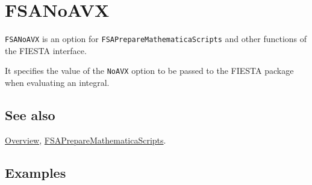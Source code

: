\documentclass[../FeynHelpersManual.tex]{subfiles}
\begin{document}
\begin{Shaded}
\begin{Highlighting}[]
 
\end{Highlighting}
\end{Shaded}

\hypertarget{fsanoavx}{
\section{FSANoAVX}\label{fsanoavx}}

\texttt{FSANoAVX} is an option for \texttt{FSAPrepareMathematicaScripts}
and other functions of the FIESTA interface.

It specifies the value of the \texttt{NoAVX} option to be passed to the
FIESTA package when evaluating an integral.

\subsection{See also}

\hyperlink{toc}{Overview},
\hyperlink{fsapreparemathematicascripts}{FSAPrepareMathematicaScripts}.

\subsection{Examples}
\end{document}
